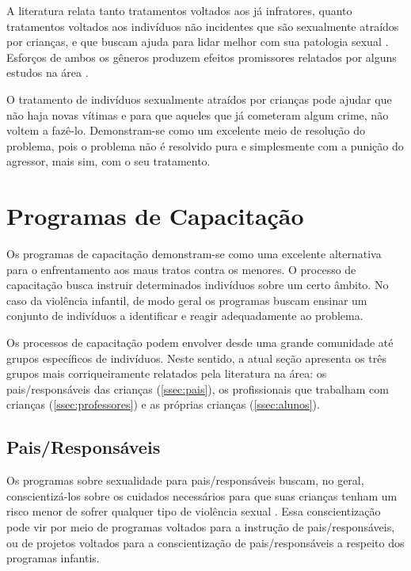 A literatura relata tanto tratamentos voltados aos já infratores, quanto tratamentos voltados aos indivíduos não incidentes que são sexualmente atraídos por crianças, e que buscam ajuda para lidar melhor com sua patologia sexual \cite{finkelhor2009prevention}. Esforços de ambos os gêneros produzem efeitos promissores relatados por alguns estudos na área \cite{mendelson2015parent}.

O tratamento de indivíduos sexualmente atraídos por crianças pode ajudar que não haja novas vítimas e para que aqueles que já cometeram algum crime, não voltem a fazê-lo. Demonstram-se como um excelente meio de resolução do problema, pois o problema não é resolvido pura e simplesmente com a punição do agressor, mais sim, com o seu tratamento. 


\section{Programas de Capacitação}\label{sec:programas}

Os programas de capacitação demonstram-se como uma excelente alternativa para o enfrentamento aos maus tratos contra os menores. O processo de capacitação busca instruir determinados indivíduos sobre um certo âmbito. No caso da violência infantil, de modo geral os programas buscam ensinar um conjunto de indivíduos a identificar e reagir adequadamente ao problema. 

Os processos de capacitação podem envolver desde uma grande comunidade até grupos específicos de indivíduos. Neste sentido, a atual seção apresenta os três grupos mais corriqueiramente relatados pela literatura na área: os pais/responsáveis das crianças (\autoref{ssec:pais}), os profissionais que trabalham com crianças (\autoref{ssec:professores}) e as próprias crianças (\autoref{ssec:alunos}).

\vspace{1.0 cm}
\subsection{Pais/Responsáveis}\label{ssec:pais}

Os programas sobre sexualidade para pais/responsáveis buscam, no geral, conscientizá-los sobre os cuidados necessários para que suas crianças tenham um risco menor de sofrer qualquer tipo de violência sexual \cite{pelisoli2010prevenccao}. Essa conscientização pode vir por meio de programas voltados para a instrução de pais/responsáveis, ou de projetos voltados para a conscientização de pais/responsáveis a respeito dos programas infantis. 

